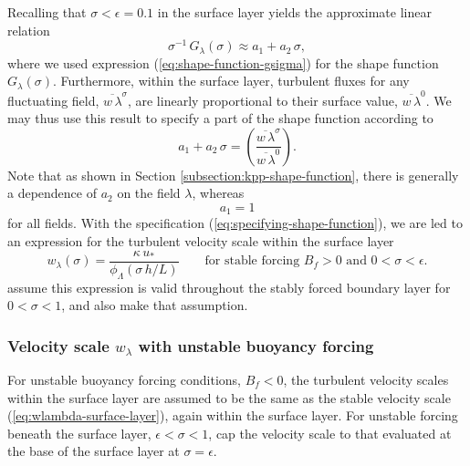 Recalling that  $\sigma < \epsilon = 0.1$ in the surface
layer yields the approximate linear relation
\begin{equation}
\sigma^{-1} \, G_{\lambda}(\sigma)  \approx a_{1} + a_{2} \, \sigma,  
\end{equation}
where we used expression (\ref{eq:shape-function-gsigma}) for the
shape function $G_{\lambda}(\sigma)$.  Furthermore, within the surface
layer, turbulent fluxes for any fluctuating field, $\overline{w \,
  \lambda}^{\sigma}$, are linearly proportional to their surface
value, $\overline{w \, \lambda}^{0}$.  We may thus use this result to
specify a part of the shape function according to
\begin{equation}
  a_{1} + a_{2} \, \sigma = \left( \frac{ \overline{w \, \lambda}^{\sigma}}{\overline{w \, \lambda}^{0}} \right).
\label{eq:specifying-shape-function}
\end{equation}
Note that as shown in Section \ref{subsection:kpp-shape-function},
there is generally a dependence of $a_{2}$ on the field $\lambda$,
whereas 
\begin{equation}
 a_{1} = 1
\end{equation}
for all fields.  With the specification
(\ref{eq:specifying-shape-function}), we are led to an expression for
the turbulent velocity scale within the surface layer
\begin{equation}
  w_{\lambda}(\sigma)  = \frac{\kappa \,  u_{*}}{\phi_{\Lambda}(\sigma  \, h/L)}   
 \qquad \mbox{for stable forcing $B_{f} > 0$ and $0 < \sigma < \epsilon$.}
\label{eq:wlambda-surface-layer}
\end{equation}
\cite{Troen_Mahrt1986} assume this expression is valid throughout the
stably forced boundary layer for $0 < \sigma < 1$, and \cite{LargeKPP}
also make that assumption.


\subsubsection{Velocity scale $w_{\lambda}$ with unstable buoyancy forcing}

For unstable buoyancy forcing conditions, $B_{f} < 0$, the turbulent
velocity scales within the surface layer are assumed to be the same as
the stable velocity scale (\ref{eq:wlambda-surface-layer}), again
within the surface layer.  For unstable forcing beneath the surface
layer, $\epsilon < \sigma < 1$, \cite{LargeKPP} cap the velocity scale
to that evaluated at the base of the surface layer at $\sigma =
\epsilon$.  

